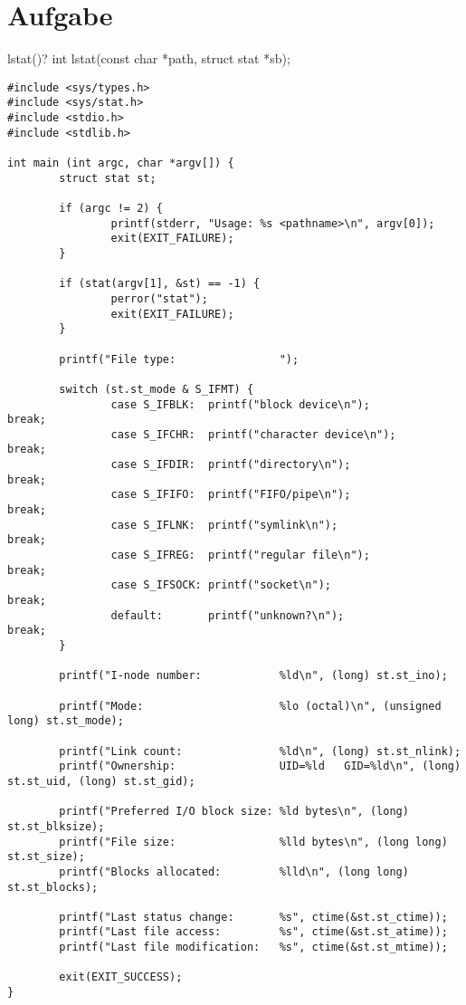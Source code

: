\documentclass[11pt,a4paper,ngerman]{article}
\begin{document}
\section{Aufgabe}
lstat()?
int lstat(const char *path, struct stat *sb);
\begin{lstlisting}
#include <sys/types.h>
#include <sys/stat.h>
#include <stdio.h>
#include <stdlib.h>

int main (int argc, char *argv[]) {
        struct stat st; 

        if (argc != 2) {
                printf(stderr, "Usage: %s <pathname>\n", argv[0]);
                exit(EXIT_FAILURE);
        }   

        if (stat(argv[1], &st) == -1) {
                perror("stat");
                exit(EXIT_FAILURE);
        }   

        printf("File type:                ");

        switch (st.st_mode & S_IFMT) {
                case S_IFBLK:  printf("block device\n");            break;
                case S_IFCHR:  printf("character device\n");        break;
                case S_IFDIR:  printf("directory\n");               break;
                case S_IFIFO:  printf("FIFO/pipe\n");               break;
                case S_IFLNK:  printf("symlink\n");                 break;
                case S_IFREG:  printf("regular file\n");            break;
                case S_IFSOCK: printf("socket\n");                  break;
                default:       printf("unknown?\n");                break;
        }   

        printf("I-node number:            %ld\n", (long) st.st_ino);

        printf("Mode:                     %lo (octal)\n", (unsigned long) st.st_mode);

        printf("Link count:               %ld\n", (long) st.st_nlink);
        printf("Ownership:                UID=%ld   GID=%ld\n", (long) st.st_uid, (long) st.st_gid);

        printf("Preferred I/O block size: %ld bytes\n", (long) st.st_blksize);
        printf("File size:                %lld bytes\n", (long long) st.st_size);
        printf("Blocks allocated:         %lld\n", (long long) st.st_blocks);

        printf("Last status change:       %s", ctime(&st.st_ctime));
        printf("Last file access:         %s", ctime(&st.st_atime));
        printf("Last file modification:   %s", ctime(&st.st_mtime));

        exit(EXIT_SUCCESS);
}

\end{lstlisting}
\end{document}
